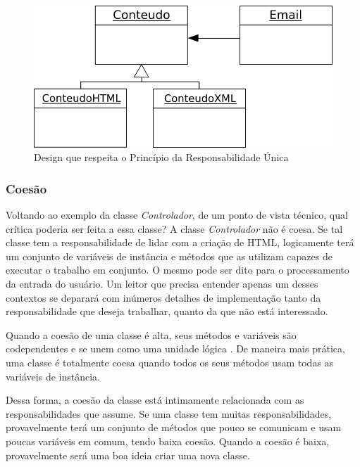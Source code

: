 \begin{figure}[!t]
\begin{centering}
\includegraphics[scale=0.7]{imagens/email.png}
\par\end{centering}

\caption{Design que respeita o Princípio da Responsabilidade Única \label{img:email}}

\end{figure}

\subsubsection{Coesão}  
\label{classes:coesao}
Voltando ao exemplo da classe \textit{Controlador}, de um ponto de vista técnico, qual crítica poderia ser feita a essa classe? 
A classe \textit{Controlador} não é coesa. Se tal classe tem a responsabilidade de lidar com a criação de HTML, logicamente terá um conjunto de variáveis de instância e métodos que as utilizam capazes de executar o trabalho em conjunto. O mesmo pode ser dito para o processamento da entrada do usuário. Um leitor que precisa entender apenas um desses contextos se deparará com inúmeros detalhes de implementação tanto da responsabilidade que deseja trabalhar, quanto da que não está interessado.
	
Quando a coesão de uma classe é alta, seus métodos e variáveis são codependentes e se unem como uma unidade lógica \citep{Beck2007}. De maneira mais prática, uma classe é totalmente coesa quando todos os seus métodos usam todas as variáveis de instância.
	
Dessa forma, a coesão da classe está intimamente relacionada com as responsabilidades que assume. Se uma classe tem muitas 
responsabilidades, provavelmente terá um conjunto de métodos que pouco se comunicam e usam poucas variáveis em comum, tendo baixa 
coesão. Quando a coesão é baixa, provavelmente será uma boa ideia criar uma nova classe.

